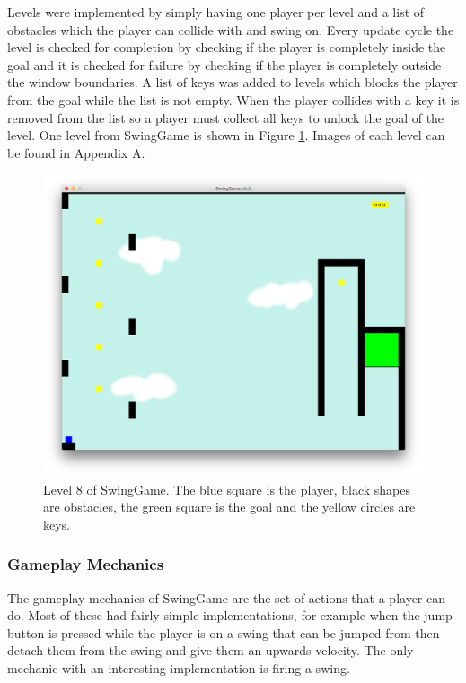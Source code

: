 \documentclass[]{report}
\begin{document}
			Levels were implemented by simply having one player per level and a list of obstacles which the player can collide with and swing on. Every update cycle the level is checked for completion by checking if the player is completely inside the goal and it is checked for failure by checking if the player is completely outside the window boundaries. A list of keys was added to levels which blocks the player from the goal while the list is not empty. When the player collides with a key it is removed from the list so a player must collect all keys to unlock the goal of the level. One level from SwingGame is shown in Figure \ref{levelexample}. Images of each level can be found in Appendix A.
			
			\begin{figure}[H]
				\centering
				\includegraphics[scale=0.25]{level8}
				\caption{Level 8 of SwingGame. The blue square is the player, black shapes are obstacles, the green square is the goal and the yellow circles are keys.}
				\label{levelexample}
			\end{figure}
			\subsubsection{Gameplay Mechanics}
			The gameplay mechanics of SwingGame are the set of actions that a player can do. Most of these had fairly simple implementations, for example when the jump button is pressed while the player is on a swing that can be jumped from then detach them from the swing and give them an upwards velocity. The only mechanic with an interesting implementation is firing a swing.
			
\end{document}
